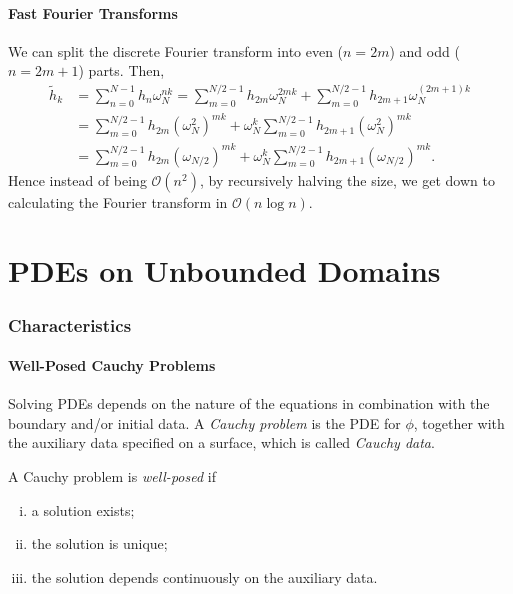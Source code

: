 \documentclass[12pt]{article}
\begin{document}
\subsection{Fast Fourier Transforms}%
\label{sub:fast_fourier_transforms}

We can split the discrete Fourier transform into even ($n = 2m$) and odd ($n = 2m + 1$) parts. Then,
\begin{align*}
	\tilde h_k &= \sum_{n = 0}^{N-1} h_n \omega_N^{nk} = \sum_{m = 0}^{N/2 - 1} h_{2m}\omega_N^{2mk} + \sum_{m = 0}^{N/2 - 1}h_{2m+1}\omega_N^{(2m+1)k} \\
		   &= \sum_{m = 0}^{N/2 - 1}h_{2m} (\omega_N^2)^{mk} + \omega_N^{k} \sum_{m = 0}^{N/2 - 1}h_{2m+1}(\omega_N^2)^{mk} \\
		   &= \sum_{m = 0}^{N/2-1}h_{2m}(\omega_{N/2})^{mk} + \omega_N^{k} \sum_{m = 0}^{N/2 - 1}h_{2m+1}(\omega_{N/2})^{mk}.
\end{align*}
Hence instead of being $\mathcal{O}(n^2)$, by recursively halving the size, we get down to calculating the Fourier transform in $\mathcal{O}(n \log n)$.

\newpage

\part{PDEs on Unbounded Domains}%
\label{prt:pdes_on_unbounded_domains}

\section{Characteristics}%
\label{sec:characteristics}

\subsection{Well-Posed Cauchy Problems}%
\label{sub:well_posed_cauchy_problems}

Solving PDEs depends on the nature of the equations in combination with the boundary and/or initial data. A \textit{Cauchy problem} is the PDE for $\phi$, together with the auxiliary data specified on a surface, which is called \textit{Cauchy data}.

A Cauchy problem is \textit{well-posed} if
\begin{enumerate}[(i)]
	\item a solution exists;
	\item the solution is unique;
	\item the solution depends continuously on the auxiliary data.
\end{enumerate}
\end{document}
